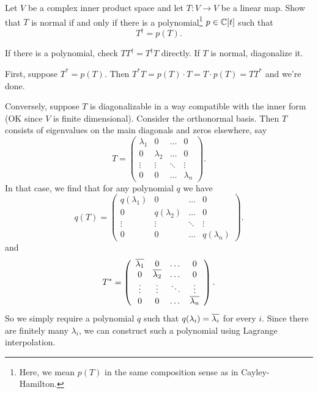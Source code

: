 \begin{problem}
	Let $V$ be a complex inner product space and let $T \colon V \to V$ be a linear map.
	Show that $T$ is normal if and only if there is a polynomial\footnote{Here,
			we mean $p(T)$ in the same composition sense as in Cayley-Hamilton.}
	$p \in \mathbb C[t]$ such that \[ T^\dagger = p(T). \]
	\begin{hint}
		If there is a polynomial, check $TT^\dagger = T^\dagger T$ directly.
		If $T$ is normal, diagonalize it.
	\end{hint}
	\begin{sol}
		First, suppose $T^\ast = p(T)$.
		Then $T^\ast T = p(T) \cdot T = T \cdot p(T) = T T^\ast$ and we're done.

		Conversely, suppose $T$ is diagonalizable
		in a way compatible with the inner form
		(OK since $V$ is finite dimensional).
		Consider the orthonormal basis.
		Then $T$ consists of eigenvalues on the main diagonals
		and zeros elsewhere, say
		\[ T = \left(
			\begin{array}{cccc}
				\lambda_1 & 0 & \dots & 0 \\
				0 & \lambda_2 & \dots & 0 \\
				\vdots & \vdots & \ddots &  \vdots \\
				0 & 0 & \dots & \lambda_n
			\end{array}
			\right). \]
		In that case, we find that for any polynomial $q$ we have
		\[ q(T) = \left(
			\begin{array}{cccc}
				q(\lambda_1) & 0 & \dots & 0 \\
				0 & q(\lambda_2) & \dots & 0 \\
				\vdots & \vdots & \ddots &  \vdots \\
				0 & 0 & \dots & q(\lambda_n)
			\end{array}
			\right). \]
		and
		\[ T^\ast = \left(
			\begin{array}{cccc}
				\overline{\lambda_1} & 0 & \dots & 0 \\
				0 & \overline{\lambda_2} & \dots & 0 \\
				\vdots & \vdots & \ddots &  \vdots \\
				0 & 0 & \dots & \overline{\lambda_n}
			\end{array}
			\right). \]
		So we simply require a polynomial $q$
		such that $q(\lambda_i) = \overline{\lambda_i}$ for every $i$.
		Since there are finitely many $\lambda_i$,
		we can construct such a polynomial using Lagrange interpolation.
	\end{sol}
\end{problem}

